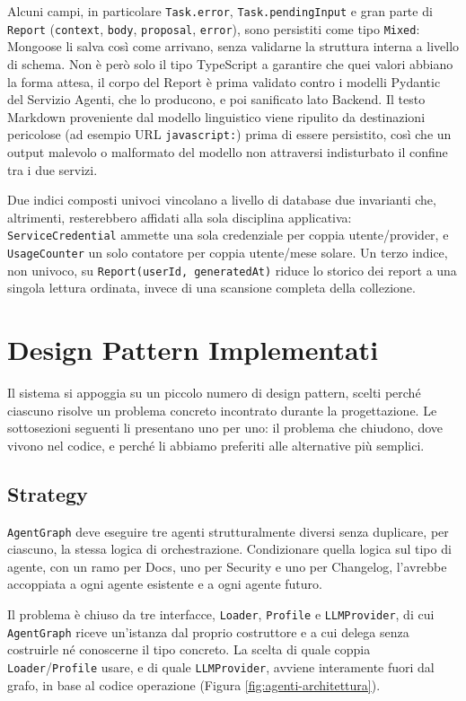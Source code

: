 \documentclass[12pt, a4paper]{article}
\begin{document}
Alcuni campi, in particolare \texttt{Task.error}, \texttt{Task.pendingInput} e gran parte di \texttt{Report} (\texttt{context}, \texttt{body}, \texttt{proposal}, \texttt{error}), sono persistiti come tipo \texttt{Mixed}: Mongoose li salva così come arrivano, senza validarne la struttura interna a livello di schema. Non è però solo il tipo TypeScript a garantire che quei valori abbiano la forma attesa, il corpo del Report è prima validato contro i modelli Pydantic del Servizio Agenti, che lo producono, e poi sanificato lato Backend. Il testo Markdown proveniente dal modello linguistico viene ripulito da destinazioni pericolose (ad esempio URL \texttt{javascript:}) prima di essere persistito, così che un output malevolo o malformato del modello non attraversi indisturbato il confine tra i due servizi.

Due indici composti univoci vincolano a livello di database due invarianti che, altrimenti, resterebbero affidati alla sola disciplina applicativa: \texttt{ServiceCredential} ammette una sola credenziale per coppia utente/provider, e \texttt{UsageCounter} un solo contatore per coppia utente/mese solare. Un terzo indice, non univoco, su \texttt{Report(userId, generatedAt)} riduce lo storico dei report a una singola lettura ordinata, invece di una scansione completa della collezione.

\newpage
\section{Design Pattern Implementati}

Il sistema si appoggia su un piccolo numero di design pattern, scelti perché ciascuno risolve un problema concreto incontrato durante la progettazione. Le sottosezioni seguenti li presentano uno per uno: il problema che chiudono, dove vivono nel codice, e perché li abbiamo preferiti alle alternative più semplici.

\subsection{Strategy}

\texttt{AgentGraph} deve eseguire tre agenti strutturalmente diversi senza duplicare, per ciascuno, la stessa logica di orchestrazione. Condizionare quella logica sul tipo di agente, con un ramo per Docs, uno per Security e uno per Changelog, l'avrebbe accoppiata a ogni agente esistente e a ogni agente futuro.

Il problema è chiuso da tre interfacce, \texttt{Loader}, \texttt{Profile} e \texttt{LLMProvider}, di cui \texttt{AgentGraph} riceve un'istanza dal proprio costruttore e a cui delega senza costruirle né conoscerne il tipo concreto. La scelta di quale coppia \texttt{Loader}/\texttt{Profile} usare, e di quale \texttt{LLMProvider}, avviene interamente fuori dal grafo, in base al codice operazione (Figura \ref{fig:agenti-architettura}).
\end{document}
